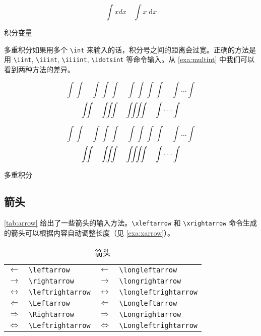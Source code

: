 \begin{example}[h]
\begin{BTDemo}[]
\newcommand{\myd}{\;\mathrm{d}}
\[ \int x dx\quad \int x \myd x \]
\end{BTDemo}
\caption{积分变量}
\label{exa:intvar}
\end{example}

多重积分如果用多个 \verb|\int| 来输入的话，积分号之间的距离会过宽。正确的方法是用 \verb|\iint|, \verb|\iiint|, \verb|\iiiint|, \verb|\idotsint| 等命令输入。从 \autoref{exa:multint} 中我们可以看到两种方法的差异。

\begin{Code}[]
\[ \int\int\quad \int\int\int\quad 
    \int\int\int\int\quad \int\dots\int \]
\[ \iint\quad \iiint\quad \iiiint\quad \idotsint \]
\end{Code}

\begin{example}[h]
\begin{Demo}
\[ \int\int\quad \int\int\int\quad 
    \int\int\int\int\quad \int\dots\int \]
\[ \iint\quad \iiint\quad \iiiint\quad \idotsint \]
\end{Demo}
\caption{多重积分}
\label{exa:multint}
\end{example}

\subsection{箭头}

\autoref{tab:arrow} 给出了一些箭头的输入方法。\verb|\xleftarrow| 和 \verb|\xrightarrow| 命令生成的箭头可以根据内容自动调整长度（见 \autoref{exa:xarrow}）。

\begin{table}[htbp]
\caption{箭头}
\label{tab:arrow}
\centering
\begin{tabular}{llll}
    \toprule
    $\leftarrow$       & \verb|\leftarrow|      & 
        $\longleftarrow$       & \verb|\longleftarrow| \\
    $\rightarrow$      & \verb|\rightarrow|     & 
        $\longrightarrow$      & \verb|\longrightarrow| \\
    $\leftrightarrow$  & \verb|\leftrightarrow| & 
        $\longleftrightarrow$  & \verb|\longleftrightarrow| \\
    $\Leftarrow$       & \verb|\Leftarrow|      & 
        $\Longleftarrow$       & \verb|\Longleftarrow| \\
    $\Rightarrow$      & \verb|\Rightarrow|     & 
        $\Longrightarrow$      & \verb|\Longrightarrow| \\
    $\Leftrightarrow$  & \verb|\Leftrightarrow| & 
        $\Longleftrightarrow$  & \verb|\Longleftrightarrow| \\
    \bottomrule
\end{tabular}
\end{table}

